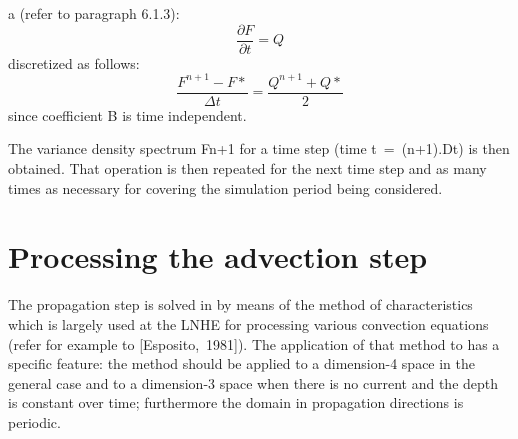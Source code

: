   a \textbf{} (refer to paragraph 6.1.3):
\begin{equation} \label{GrindEQ__6_5_}
\frac{\partial F}{\partial t} =Q
\end{equation}
discretized as follows:
\begin{equation} \label{GrindEQ__6_6_}
\frac{F^{n+1} -F*}{\Delta t} =\frac{Q^{n+1} +Q*}{2}
\end{equation}
since coefficient B is time independent.

 The variance density spectrum Fn+1 for a time step (time t~=~(n+1).Dt) is then obtained. That operation is then repeated for the next time step and as many times as necessary for covering the simulation period being considered.


\section{ Processing the advection step}

 The propagation step is solved in \tomawac by means of the method of characteristics which is largely used at the LNHE for processing various convection equations (refer for example to [Esposito,~1981]). The application of that method to \tomawac has a specific feature: the method should be applied to a dimension-4 space in the general case and to a dimension-3 space when there is no current and the depth is constant over time; furthermore the domain in propagation directions is periodic.

